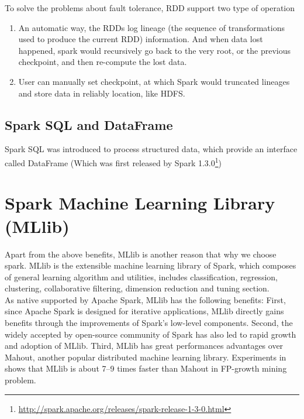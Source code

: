 To solve the problems about fault tolerance, RDD support two type of operation

\begin{enumerate}
	\item An automatic way, the RDDs log lineage (the sequence of transformations used to produce the current RDD) information\cite[Section~2.5]{zaharia2012resilient}. And when data lost happened, spark would recursively go back to the very root, or the previous checkpoint, and then re-compute the lost data.
	\item User can manually set checkpoint, at which Spark would truncated lineages and store data in reliably location, like HDFS\cite[Section~5.3]{zaharia2012resilient}.
\end{enumerate}

\subsection{Spark SQL and DataFrame}
Spark SQL was introduced to process structured data, which provide an interface called DataFrame (Which was first released by Spark 1.3.0\footnote{\url{http://spark.apache.org/releases/spark-release-1-3-0.html}})

\section{Spark Machine Learning Library (MLlib)}
Apart from the above benefits, MLlib is another reason that why we choose spark. MLlib is the extensible machine learning  library of Spark, which composes of general learning algorithm and utilities, includes classification, regression, clustering, collaborative filtering, dimension reduction and tuning section\cite{meng2016mllib}.\\


As native supported by Apache Spark, MLlib has the following benefits\cite{meng2016mllib}: First, since Apache Spark is designed for iterative applications, MLlib directly gains benefits through the improvements of Spark's low-level components. Second, the widely accepted by open-source community of Spark has also led to rapid growth and adoption of MLlib. Third, MLlib has great performances advantages over Mahout, another popular distributed machine learning library. Experiments in \cite{1_li_jiang_zhang_boesch_xiao_2015} shows that MLlib is about 7--9 times faster than Mahout in FP-growth mining problem.\\


